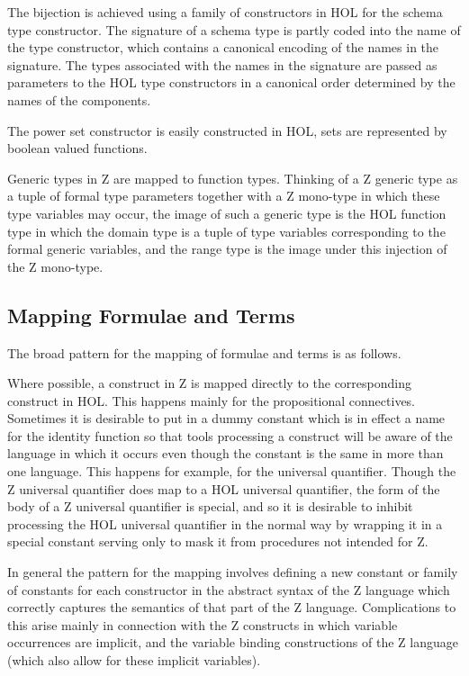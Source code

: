 \documentclass[10pt,titlepage]{book}
\begin{document}
The bijection is achieved using a family of constructors in HOL for the schema type constructor.
The signature of a schema type is partly coded into the name of the type constructor, which contains a canonical encoding of the names in the signature.
The types associated with the names in the signature are passed as parameters to the HOL type constructors in a canonical order determined by the names of the components.

The power set constructor is easily constructed in HOL, sets are represented by boolean valued functions.

Generic types in Z are mapped to function types.
Thinking of a Z generic type as a tuple of formal type parameters together with a Z mono-type in which these type variables may occur, the image of such a generic type is the HOL function type in which the domain type is a tuple of type variables corresponding to the formal generic variables, and the range type is the image under this injection of the Z mono-type.

\subsection{Mapping Formulae and Terms}

The broad pattern for the mapping of formulae and terms is as follows.

Where possible, a construct in Z is mapped directly to the corresponding construct in HOL.
This happens mainly for the propositional connectives.
Sometimes it is desirable to put in a dummy constant which is in effect a name for the identity function so  that tools processing a construct will be aware of the language in which it occurs even though the constant is the same in more than one language.
This happens for example, for the universal quantifier.
Though the Z universal quantifier does map to a HOL universal quantifier, the form of the body of a Z universal quantifier is special, and so it is desirable to inhibit processing the HOL universal quantifier in the normal way by wrapping it in a special constant serving only to mask it from procedures not intended for Z.

In general the pattern for the mapping involves defining a new constant or family of constants for each constructor in the abstract syntax of the Z language which correctly captures the semantics of that part of the Z language.
Complications to this arise mainly in connection with the Z constructs in which variable occurrences are implicit, and the variable binding constructions of the Z language (which also allow for these implicit variables).
\end{document}
